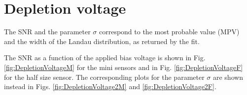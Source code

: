 \section{Depletion voltage}
\label{sec:DepletionVoltage}

The SNR and the parameter $\sigma$ correspond to the most probable value (MPV) and the width of the Landau distribution, as returned by the fit. 

The SNR as a function of the applied bias voltage is shown in Fig. \ref{fig:DepletionVoltageM} for the mini sensors and in Fig. \ref{fig:DepletionVoltageF} for the half size sensor.
The corresponding plots for the parameter $\sigma$ are shown instead in Figs. \ref{fig:DepletionVoltage2M} and \ref{fig:DepletionVoltage2F}.



